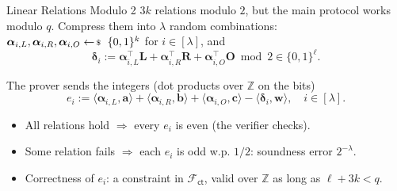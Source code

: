 \documentclass{zkdl-presentation-template}
\begin{document}
    \begin{frame}{Linear Relations Modulo 2}
        $3k$ relations modulo $2$, but the main protocol works modulo $q$. Compress them into $\lambda$ random combinations: $\boldsymbol{\alpha}_{i,L}, \boldsymbol{\alpha}_{i,R}, \boldsymbol{\alpha}_{i,O} \leftarrowS \{0,1\}^k$ for $i \in [\lambda]$, and
        \begin{equation*}
            \boldsymbol{\delta}_i := \boldsymbol{\alpha}_{i,L}^{\top}\mathbf{L} + \boldsymbol{\alpha}_{i,R}^{\top}\mathbf{R} + \boldsymbol{\alpha}_{i,O}^{\top}\mathbf{O} \bmod 2 \in \{0,1\}^{\ell}.
        \end{equation*}
        \pause
        \vspace{-10pt}

        The prover sends the integers (dot products over $\mathbb{Z}$ on the bits)
        \begin{equation*}
            e_i := \langle \boldsymbol{\alpha}_{i,L}, \mathbf{a} \rangle + \langle \boldsymbol{\alpha}_{i,R}, \mathbf{b} \rangle + \langle \boldsymbol{\alpha}_{i,O}, \mathbf{c} \rangle - \langle \boldsymbol{\delta}_i, \mathbf{w} \rangle, \quad i \in [\lambda].
        \end{equation*}
        \pause
        \vspace{-10pt}

        \begin{itemize}
            \item All relations hold $\Rightarrow$ every $e_i$ is even (the verifier checks).\pause
            \item Some relation fails $\Rightarrow$ each $e_i$ is odd w.p. $1/2$: soundness error $2^{-\lambda}$.\pause
            \item Correctness of $e_i$: a constraint in $\mathcal{F}_{\mathsf{ct}}$, valid over $\mathbb{Z}$ as long as $\ell + 3k < q$.
        \end{itemize}
    \end{frame}
\end{document}
